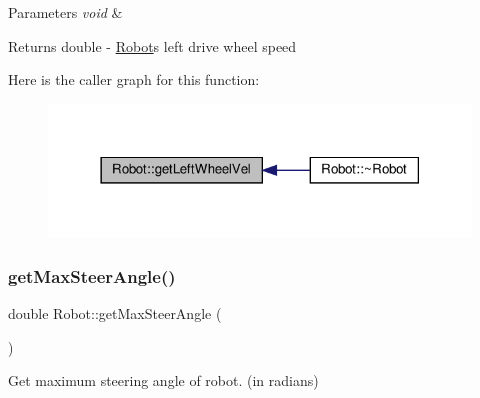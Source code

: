 \begin{DoxyParams}{Parameters}
{\em void} & \\
\hline
\end{DoxyParams}
\begin{DoxyReturn}{Returns}
double -\/ \hyperlink{classRobot}{Robot}\textquotesingle{}s left drive wheel speed 
\end{DoxyReturn}
Here is the caller graph for this function\+:
\nopagebreak
\begin{figure}[H]
\begin{center}
\leavevmode
\includegraphics[width=318pt]{classRobot_a99559e14e93539d1deaf5f0405dfce76_icgraph}
\end{center}
\end{figure}
\mbox{\label{classRobot_ad51f91ba00dfe4efa1bf0a10ea3213e6}} 
\subsubsection{\texorpdfstring{get\+Max\+Steer\+Angle()}{getMaxSteerAngle()}}
{\footnotesize\ttfamily double Robot\+::get\+Max\+Steer\+Angle (\begin{DoxyParamCaption}{ }\end{DoxyParamCaption})}



Get maximum steering angle of robot. (in radians) 


